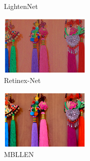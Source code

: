 \documentclass[letterpaper,12pt]{article}
\begin{document}
\begin{figure}[htbp]
\begin{subfigure}{0.18\textwidth}
			\captionsetup{font=scriptsize}
			\caption{LightenNet}
			\label{fig: LOL-test_c}  
		\end{subfigure}
		\begin{subfigure}{0.18\textwidth}
			\includegraphics[width=\linewidth]{LOL-test_dataset/Retinex-Net}
			\captionsetup{font=scriptsize}
			\caption{Retinex-Net}
			\label{fig: LOL-test_d}
		\end{subfigure}
		\begin{subfigure}{0.18\textwidth}
			\includegraphics[width=\linewidth]{LOL-test_dataset/MBLLEN}
			\captionsetup{font=scriptsize}
			\caption{MBLLEN}
			\label{fig: LOL-test_e}
		\end{subfigure}\\
		\begin{subfigure}{0.18\textwidth}

\end{subfigure}
\end{figure}
\end{document}
